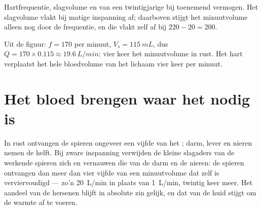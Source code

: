 \begin{omfigure}

{\small Hartfrequentie, slagvolume en  van een
twintigjarige bij toenemend vermogen. Het slagvolume vlakt bij matige
inspanning af; daarboven stijgt het minuutvolume alleen nog door de
frequentie, en die vlakt zelf af bij $220 - 20 = 200$.}
\end{omfigure}

\begin{example}\label{ex:g10:heart-lungs-effort:output200}
Uit de figuur: $f = 170$ per minuut, $V_s = \qty{115}{mL}$, dus
$Q = 170 \times 0.115 \approx \qty{19.6}{L/min}$: vier keer het
minuutvolume in rust. Het hart verplaatst het hele bloedvolume van het
lichaam vier keer per minuut.
\end{example}

\section{Het bloed brengen waar het nodig is}

\begin{proposition}\label{prop:g10:heart-lungs-effort:redistribution}
In rust ontvangen de spieren ongeveer een vijfde van het
; darm, lever en nieren nemen de helft. Bij zware
inspanning verwijden de kleine slagaders van de werkende spieren zich en
vernauwen die van de darm en de nieren: de spieren ontvangen dan meer dan
vier vijfde van een minuutvolume dat zelf is verviervoudigd --- zo'n
\qty{20}{L/min} in plaats van \qty{1}{L/min}, twintig keer meer. Het
aandeel van de hersenen blijft in absolute zin gelijk, en dat van de huid
stijgt om de warmte af te voeren.
\end{proposition}
\admitted

